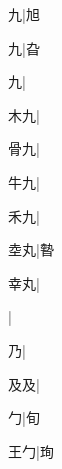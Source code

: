 \begin{multicols}{2}
{{\cjk{}{\cnsym{}　}{\cnsym{}　}九}\mktsJzrVerticalBar{}{\cjk{}{\cnsym{}　}{\cnsym{}　}{\cnsym{}　}}|{\cjk{}旭}\par
{\cjk{}{\cnsym{}　}{\cnsym{}　}九}\mktsJzrVerticalBar{}{\cjk{}{\cnsym{}　}{\cnsym{}　}{\cnsym{}　}}|{\cjk{}旮}\par
{九}\mktsJzrVerticalBar{}{\cjk{}{\cnsym{}　}{\cnsym{}　}{\cnsym{}　}}|{}\par
{\cjk{}{\cnsym{}　}木九}\mktsJzrVerticalBar{}{\cjk{}{\cnsym{}　}{\cnsym{}　}{\cnsym{}　}}|{}\par
{\cjk{}{\cnsym{}　}骨九}\mktsJzrVerticalBar{}{\cjk{}{\cnsym{}　}{\cnsym{}　}{\cnsym{}　}}|{}\par
{\cjk{}{\cnsym{}　}牛九}\mktsJzrVerticalBar{}{\cjk{}{\cnsym{}　}{\cnsym{}　}{\cnsym{}　}}|{}\par
{\cjk{}{\cnsym{}　}禾九}\mktsJzrVerticalBar{}{\cjk{}{\cnsym{}　}{\cnsym{}　}{\cnsym{}　}}|{}\par
{\cjk{}{\cnsym{}　}坴丸}\mktsJzrVerticalBar{}{\cjk{}{\cnsym{}　}{\cnsym{}　}{\cnsym{}　}}|{\cjk{}暬}\par
{\cjk{}{\cnsym{}　}幸丸}\mktsJzrVerticalBar{}{\cjk{}{\cnsym{}　}{\cnsym{}　}{\cnsym{}　}}|{}\par
{}\mktsJzrVerticalBar{}{\cjk{}{\cnsym{}　}{\cnsym{}　}{\cnsym{}　}}|{}\par
{\cjk{}{\cnsym{}　}{\cnsym{}　}乃}\mktsJzrVerticalBar{}{\cjk{}{\cnsym{}　}{\cnsym{}　}{\cnsym{}　}}|{}\par
{及及}\mktsJzrVerticalBar{}{\cjk{}{\cnsym{}　}{\cnsym{}　}{\cnsym{}　}}|{}\par
{\cjk{}{\cnsym{}　}{\cnsym{}　}勹}\mktsJzrVerticalBar{}{\cjk{}{\cnsym{}　}{\cnsym{}　}{\cnsym{}　}}|{\cjk{}旬}\par
{\cjk{}{\cnsym{}　}王勹}\mktsJzrVerticalBar{}{\cjk{}{\cnsym{}　}{\cnsym{}　}{\cnsym{}　}}|{\cjk{}珣}\par
}
\end{multicols}
